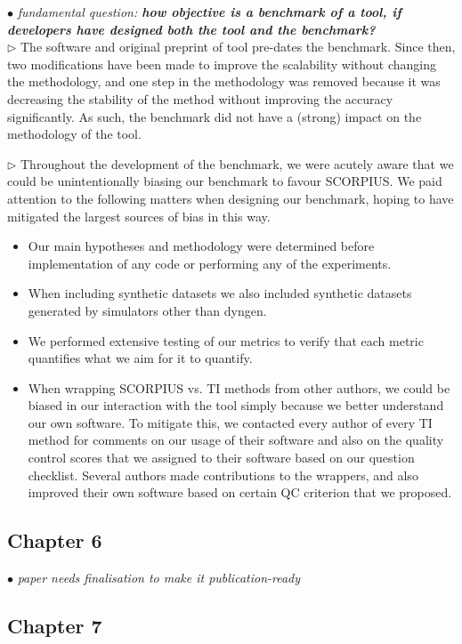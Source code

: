 \documentclass[10pt]{article}
\newcommand{\exam}[2][\  ]{\hspace{0pt}\marginpar{\color{myred}#1}$\bullet$ \textit{#2}}
\newcommand{\imp}[1]{\textbf{#1}}
\newcommand{\answ}[1]{{\color{myblue} $\triangleright$ #1}}
\newcommand{\bigexclaim}{\raisebox{-0.1em}{\BigTriangleUp}\hspace{-0.32em}\llap{\small\textbf{!}}\hspace{0.32em}}
\newcommand{\tagimp}{\bigexclaim}
\begin{document}
\exam[\tagimp]{fundamental question: \imp{how objective is a benchmark of a tool, if developers have designed both the tool and the benchmark?}} \\
\answ{The software and original preprint of tool pre-dates the benchmark. Since then, two modifications have been made to improve the scalability without changing the methodology, and one step in the methodology was removed because it was decreasing the stability of the method without improving the accuracy significantly. As such, the benchmark did not have a (strong) impact on the methodology of the tool.} \\
\answ{Throughout the development of the benchmark, we were acutely aware that we could be unintentionally biasing our benchmark to favour SCORPIUS. We paid attention to the following matters when designing our benchmark, hoping to have mitigated the largest sources of bias in this way.
\begin{itemize}
	\item Our main hypotheses and methodology were determined before implementation of any code or performing any of the experiments.
	\item When including synthetic datasets we also included synthetic datasets generated by simulators other than dyngen. 
	\item We performed extensive testing of our metrics to verify that each metric quantifies what we aim for it to quantify.
	\item When wrapping SCORPIUS vs. TI methods from other authors, we could be biased in our interaction with the tool simply because we better understand our own software. To mitigate this, we contacted every author of every TI method for comments on our usage of their software and also on the quality control scores that we assigned to their software based on our question checklist. Several authors made contributions to the wrappers, and also improved their own software based on certain QC criterion that we proposed.
\end{itemize}
}

\subsection{Chapter 6}

\exam{paper needs finalisation to make it publication-ready}

\subsection{Chapter 7}
\end{document}
